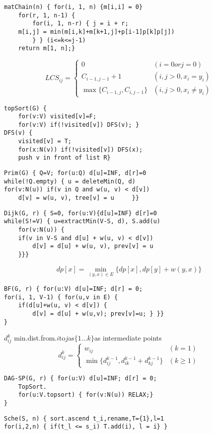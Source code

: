 \documentclass[10pt]{report}
\begin{document}
 
\begin{multicols}{2}
\begin{lstlisting}[style=Cstyle]
matChain(n) { for(i, 1, n) {m[i,i] = 0}
	for(r, 1, n-1) {
		for(i, 1, n-r) { j = i + r; 
	m[i,j] = min(m[i,k]+m[k+1,j]+p[i-1]p[k]p[j])
		} } (i<=k<=j-1)
	return m[1, n];}
\end{lstlisting}
$$LCS_{ij} = \begin{cases}
	0 & (i=0 or j=0) \\ C_{i-1, j-1}+1 & (i, j>0, x_i=y_i) \\ \max\{C_{i-1, j}, C_{i, j-1}\} & (i, j > 0, x_i \neq y_i)
\end{cases}$$
\begin{lstlisting}[style=Cstyle]
topSort(G) {
	for(v:V) visited[v]=F;
	for(v:V) if(!visited[v]) DFS(v); }
DFS(v) {
	visited[v] = T;
	for(x:N(v)) if(!visited[v]) DFS(x);
	push v in front of list R}
\end{lstlisting}
\begin{lstlisting}[style=Cstyle]
Prim(G) { Q=V; for(u:Q) d[u]=INF, d[r]=0
while(!Q.empty) { u = deleteMin(Q, d)
for(v:N(u)) if(v in Q and w(u, v) < d[v]) 
	d[v] = w(u, v), tree[v] = u     }}
\end{lstlisting}
\begin{lstlisting}[style=Cstyle]
Dijk(G, r) { S=0, for(u:V){d[u]=INF} d[r]=0
while(S!=V) { u=extractMin(V-S, d), S.add(u)
	for(v:N(u)) { 
	if(v in V-S and d[u] + w(u, v) < d[v]) 
		d[v] = d[u] + w(u, v), prev[v] = u
	}}}
\end{lstlisting}
$$dp[x] = \min_{(y, x)\in E}\{dp[x], dp[y] + w(y, x)\}$$
\begin{lstlisting}[style=Cstyle]
BF(G, r) { for(u:V) d[u]=INF; d[r] = 0;
for(i, 1, V-1) { for(u,v in E) {
	if(d[u]+w(u, v) < d[v]) {
		d[v] = d[u] + w(u,v); prev[v]=u; } }}
}
\end{lstlisting}
$d_{ij}^k$ min.dist.from.$i$to$j$as$\{1...k\}$as intermediate points
$$d_{ij}^k = \begin{cases}
	w_{ij} & (k = 1) \\ \min \{d_{ij}^{k-1}, d_{ik}^{k-1} + d_{kj}^{k-1}\} & (k\geq 1)
\end{cases}$$
\begin{lstlisting}[style=Cstyle]
DAG-SP(G, r) { for(u:V) d[u]=INF; d[r] = 0;
	TopSort. 
	for(u:V.topsort) { for(v:N(u)) RELAX;}
}
\end{lstlisting}
\begin{lstlisting}[style=Cstyle]
Sche(S, n) { sort.ascend t_i,rename,T={1},l=1
for(i,2,n) { if(t_l <= s_i) T.add(i), l = i} }

\end{lstlisting}
\end{multicols}
\end{document}
